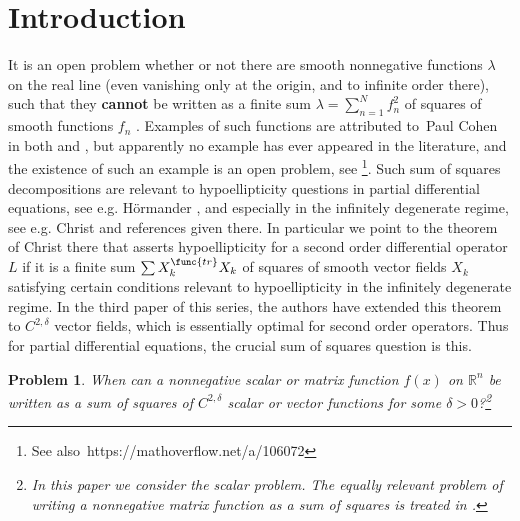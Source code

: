 \documentclass{amsart}
\theoremstyle{plain}
\newtheorem{problem}{Problem}
\numberwithin{equation}{section}
\begin{document}
\tableofcontents


\section{Introduction}

It is an open problem whether or not there are smooth nonnegative functions $%
\lambda $ on the real line (even vanishing only at the origin, and to
infinite order there), such that they \textbf{cannot} be written as a finite
sum $\lambda =\sum_{n=1}^{N}f_{n}^{2}$ of squares of smooth functions $f_{n}$%
. Examples of such functions are attributed to\ Paul Cohen in both \cite{Bru}
and \cite{BoCoRo}, but apparently no example has ever appeared in the
literature, and the existence of such an example is an open problem, see 
\cite[Remark 5.1]{Pie}\footnote{%
See also\ https://mathoverflow.net/a/106072}. Such sum of squares
decompositions are relevant to hypoellipticity questions in partial
differential equations, see e.g. H\"{o}rmander \cite{Ho}, and especially in
the infinitely degenerate regime, see e.g. Christ \cite{Chr} and references
given there. In particular we point to the theorem of Christ there that
asserts hypoellipticity for a second order differential operator $L$ if it
is a finite sum $\sum X_{k}^{\func{tr}}X_{k}$ of squares of smooth vector
fields $X_{k}$ satisfying certain conditions relevant to hypoellipticity in
the infinitely degenerate regime. In the third paper \cite{KoSa3} of this
series, the authors have extended this theorem to $C^{2,\delta }$ vector
fields, which is essentially optimal for second order operators. Thus for
partial differential equations, the crucial sum of squares question is this.

\begin{problem}
When can a nonnegative scalar or matrix function $f\left( x\right) $ on $%
\mathbb{R}^{n}$ be written as a sum of squares of $C^{2,\delta }$ scalar or
vector functions for some $\delta >0$?\footnote{%
In this paper we consider the scalar problem. The equally relevant problem of writing a nonnegative matrix function as a
sum of squares is treated in \cite{KoSa2}.}
\end{problem}
\end{document}
